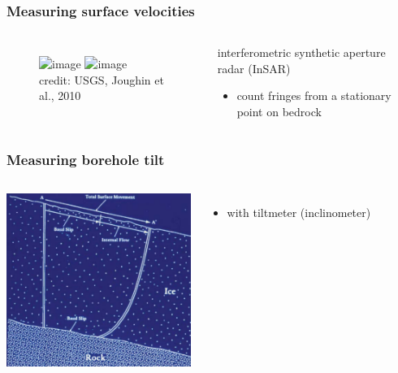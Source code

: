 \documentclass[hide notes,intlimits]{beamer}
\begin{document}
\begin{frame}
  \frametitle{Measuring surface velocities}
  \vspace{-2em}
  \begin{columns}
    \column[C]{5.5cm}
    \begin{figure}
    \includegraphics<1>[width=5.5cm]{figures/insar}%
    \includegraphics<2>[width=5.5cm]{figures/Joughin2010Fig6a}%
    \\ \small{credit: USGS, Joughin et al., 2010}
  \end{figure}
   \column[C]{6.5cm}
    \begin{block}{interferometric synthetic aperture radar (InSAR)}
      \begin{itemize}
      \item count fringes from a stationary point on bedrock
     \end{itemize}
    \end{block}
  \end{columns}
\end{frame}


\begin{frame}
  \frametitle{Measuring borehole tilt}
  \begin{columns}
    \column[C]{6.5cm}
    \includegraphics[width=6cm]{figures/geschw_vert_prof}%
   \column[C]{4.5cm}
     \begin{itemize}
      \item with tiltmeter (inclinometer)
     \end{itemize}
 \end{columns}
\end{frame}
\end{document}
